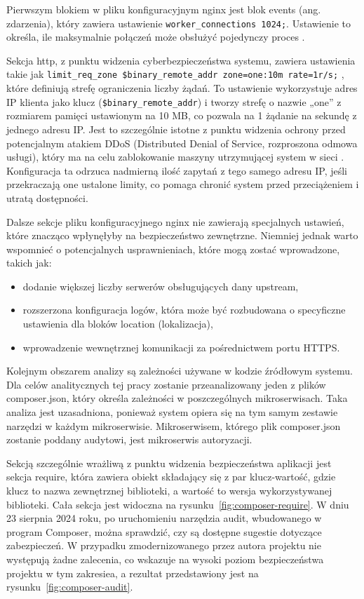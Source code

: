 \documentclass[12pt,twoside]{book}
\begin{document}
    Pierwszym blokiem w pliku konfiguracyjnym nginx jest blok events (ang. zdarzenia), który zawiera ustawienie \texttt{worker\_connections 1024;}. Ustawienie to określa, ile maksymalnie połączeń może obsłużyć pojedynczy proces \cite{nginx.worker.processes}.

    Sekcja http, z punktu widzenia cyberbezpieczeństwa systemu, zawiera ustawienia takie jak \texttt{limit\_req\_zone \$binary\_remote\_addr zone=one:10m rate=1r/s;} \cite{nginx.limit.req.zone}, które definiują strefę ograniczenia liczby żądań. To ustawienie wykorzystuje adres IP klienta jako klucz (\texttt{\$binary\_remote\_addr}) i tworzy strefę o nazwie „one” z rozmiarem pamięci ustawionym na 10 MB, co pozwala na 1 żądanie na sekundę z jednego adresu IP. Jest to szczególnie istotne z punktu widzenia ochrony przed potencjalnym atakiem DDoS (Distributed Denial of Service, rozproszona odmowa usługi), który ma na celu zablokowanie maszyny utrzymującej system w sieci \cite{cisa.ddos}. Konfiguracja ta odrzuca nadmierną ilość zapytań z tego samego adresu IP, jeśli przekraczają one ustalone limity, co pomaga chronić system przed przeciążeniem i utratą dostępności.

    Dalsze sekcje pliku konfiguracyjnego nginx nie zawierają specjalnych ustawień, które znacząco wpłynęłyby na bezpieczeństwo zewnętrzne. Niemniej jednak warto wspomnieć o potencjalnych usprawnieniach, które mogą zostać wprowadzone, takich jak:

    \begin{itemize}
        \item dodanie większej liczby serwerów obsługujących dany upstream,
        \item rozszerzona konfiguracja logów, która może być rozbudowana o specyficzne ustawienia dla bloków location (lokalizacja),
        \item wprowadzenie wewnętrznej komunikacji za pośrednictwem portu HTTPS.
    \end{itemize}

    Kolejnym obszarem analizy są zależności używane w kodzie źródłowym systemu. Dla celów analitycznych tej pracy zostanie przeanalizowany jeden z plików composer.json, który określa zależności w poszczególnych mikroserwisach. Taka analiza jest uzasadniona, ponieważ system opiera się na tym samym zestawie narzędzi w każdym mikroserwisie. Mikroserwisem, którego plik composer.json zostanie poddany audytowi, jest mikroserwis autoryzacji.

    Sekcją szczególnie wrażliwą z punktu widzenia bezpieczeństwa aplikacji jest sekcja require, która zawiera obiekt składający się z par klucz-wartość, gdzie klucz to nazwa zewnętrznej biblioteki, a wartość to wersja wykorzystywanej biblioteki. Cała sekcja jest widoczna na rysunku~\ref{fig:composer-require}. W dniu 23 sierpnia 2024 roku, po uruchomieniu narzędzia audit, wbudowanego w program Composer, można sprawdzić, czy są dostępne sugestie dotyczące zabezpieczeń. W przypadku zmodernizowanego przez autora projektu nie występują żadne zalecenia, co wskazuje na wysoki poziom bezpieczeństwa projektu w tym zakresiea, a rezultat przedstawiony jest na rysunku~\ref{fig:composer-audit}.
\end{document}
